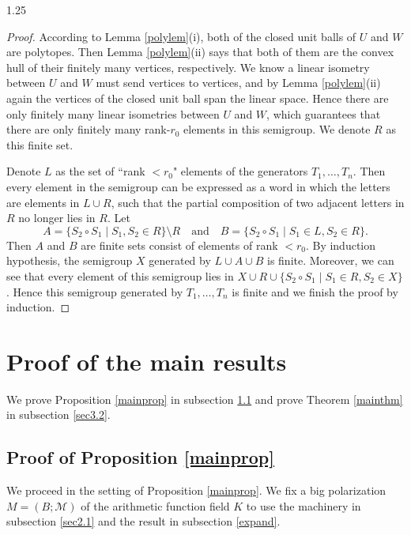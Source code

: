 \documentclass[12pt]{article}
\begin{document}
\begin{spacing}{1.25}
\begin{proof}
According to Lemma \ref{polylem}(i), both of the closed unit balls of $U$ and $W$ are polytopes. Then Lemma \ref{polylem}(ii) says that both of them are the convex hull of their finitely many vertices, respectively. We know a linear isometry between $U$ and $W$ must send vertices to vertices, and by Lemma \ref{polylem}(ii) again the vertices of the closed unit ball span the linear space. Hence there are only finitely many linear isometries between $U$ and $W$, which guarantees that there are only finitely many rank-$r_0$ elements in this semigroup. We denote $R$ as this finite set.

Denote $L$ as the set of ``rank $<r_0$" elements of the generators $T_1,\dots,T_n$. Then every element in the semigroup can be expressed as a word in which the letters are elements in $L\cup R$, such that the partial composition of two adjacent letters in $R$ no longer lies in $R$. Let
$$
A=\{S_2\circ S_1\mid S_1,S_2\in R\}\setminus R\quad\textrm{and}\quad B=\{S_2\circ S_1\mid S_1\in L,S_2\in R\}.
$$
Then $A$ and $B$ are finite sets consist of elements of rank $<r_0$. By induction hypothesis, the semigroup $X$ generated by $L\cup A\cup B$ is finite. Moreover, we can see that every element of this semigroup lies in $X\cup R\cup\{S_2\circ S_1\mid S_1\in R,S_2\in X\}$. Hence this semigroup generated by $T_1,\dots,T_n$ is finite and we finish the proof by induction.
\end{proof}















\section{Proof of the main results}\label{Sec3}

We prove Proposition \ref{mainprop} in subsection \ref{sec3.1} and prove Theorem \ref{mainthm} in subsection \ref{sec3.2}.


\subsection{Proof of Proposition \ref{mainprop}}\label{sec3.1}

We proceed in the setting of Proposition \ref{mainprop}. We fix a big polarization $M=(B;\mathcal{M})$ of the arithmetic function field $K$ to use the machinery in subsection \ref{sec2.1} and the result in subsection \ref{expand}.


\end{spacing}
\end{document}
